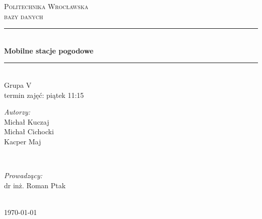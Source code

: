 \begin{titlepage}

\newcommand{\HRule}{\rule{\linewidth}{0.5mm}}
\center
 
\textsc{\LARGE Politechnika Wrocławska}\\[1.5cm] 
\textsc{\Large bazy danych}\\[1cm] %

\HRule \\[0.5cm]
{ \Large \bfseries Mobilne stacje pogodowe}\\[0.5cm] %
\HRule \\[1cm]
 Grupa V\\
 termin zajęć: piątek 11:15\\[1cm]
\begin{minipage}[t]{0.4\textwidth}
\begin{flushleft} \large
\emph{Autorzy:}\\
 Michał Kuczaj  \\
 Michał Cichocki \\
 Kacper Maj 
\end{flushleft}
\end{minipage}
~
\begin{minipage}[t]{0.4\textwidth}
\begin{flushright} \large
\emph{Prowadzący:} \\
dr inż. Roman Ptak %
\end{flushright}
\end{minipage}\\[4cm]

\vfill
{\large \today }\\[2cm] %


\end{titlepage}
